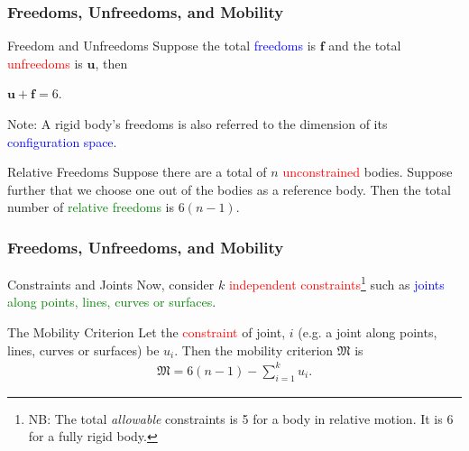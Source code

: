 \begin{frame}
	\frametitle{Freedoms, Unfreedoms, and Mobility}
	\begin{block}{Freedom and Unfreedoms}
		Suppose the total \textcolor{blue}{freedoms} is $\bm{f}$ and the total \textcolor{red}{unfreedoms} is $\bm{u}$, then
		\begin{description}
			\item $\bm{u}+\bm{f}=6.$
			\label{eq:freedomunfreedom}
		\end{description}
	Note: A rigid body's freedoms is also referred to the dimension of  its \textcolor{blue}{configuration space}.
	\end{block}
	\begin{block}{Relative Freedoms}
		Suppose there are a total of $n$ \textcolor{red}{unconstrained} bodies. Suppose further that we choose one out of the bodies as a reference body. Then the total number of \textcolor{green}{relative freedoms} is $6(n-1)$.
	\end{block}
\end{frame}

\begin{frame}
	\frametitle{Freedoms, Unfreedoms, and Mobility}
	\begin{block}{Constraints and Joints}
		Now, consider $k$ \textcolor{red}{independent constraints}\footnote{NB: The total \textit{allowable} constraints is 5 for a body in relative motion. It is 6 for a fully rigid body.} such as \textcolor{blue}{joints} \textcolor{green}{along points, lines, curves or surfaces}.
	\end{block}
	
	\begin{block}{The Mobility Criterion}
		Let the \textcolor{red}{constraint} of joint, $i$ (e.g. a joint along points, lines, curves or surfaces) be $u_i$. Then the mobility criterion $\mathfrak{M}$ is
		\begin{align}
			\mathfrak{M}=6(n-1) - \sum_{i=1}^{k}u_i.
		\end{align}
	\end{block}
\end{frame}

